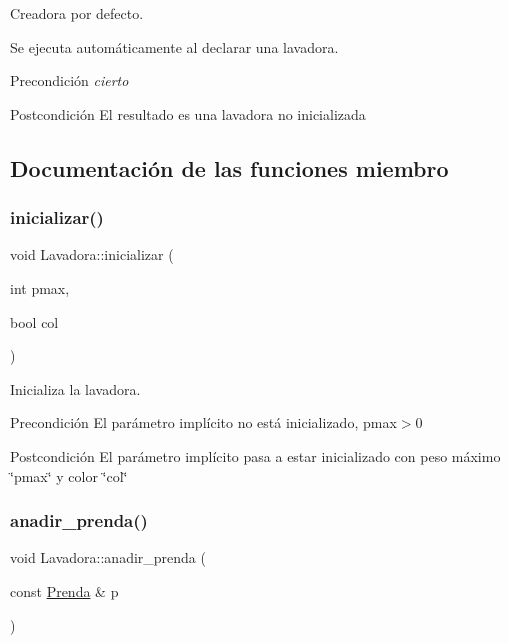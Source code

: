 Creadora por defecto. 

Se ejecuta automáticamente al declarar una lavadora. \begin{DoxyPrecond}{Precondición}
{\itshape cierto} 
\end{DoxyPrecond}
\begin{DoxyPostcond}{Postcondición}
El resultado es una lavadora no inicializada 
\end{DoxyPostcond}


\subsection{Documentación de las funciones miembro}
\mbox{\label{class_lavadora_a733af02910dca3f75390be4ca6ac84f6}} 
\subsubsection{\texorpdfstring{inicializar()}{inicializar()}}
{\footnotesize\ttfamily void Lavadora\+::inicializar (\begin{DoxyParamCaption}\item[{int}]{pmax,  }\item[{bool}]{col }\end{DoxyParamCaption})}



Inicializa la lavadora. 

\begin{DoxyPrecond}{Precondición}
El parámetro implícito no está inicializado, pmax$>$0 
\end{DoxyPrecond}
\begin{DoxyPostcond}{Postcondición}
El parámetro implícito pasa a estar inicializado con peso máximo \char`\"{}pmax\char`\"{} y color \char`\"{}col\char`\"{} 
\end{DoxyPostcond}
\mbox{\label{class_lavadora_a7e465e1f11ba5ba3cffcee1ce9507e79}} 
\subsubsection{\texorpdfstring{anadir\+\_\+prenda()}{anadir\_prenda()}}
{\footnotesize\ttfamily void Lavadora\+::anadir\+\_\+prenda (\begin{DoxyParamCaption}\item[{const \hyperlink{class_prenda}{Prenda} \&}]{p }\end{DoxyParamCaption})}



